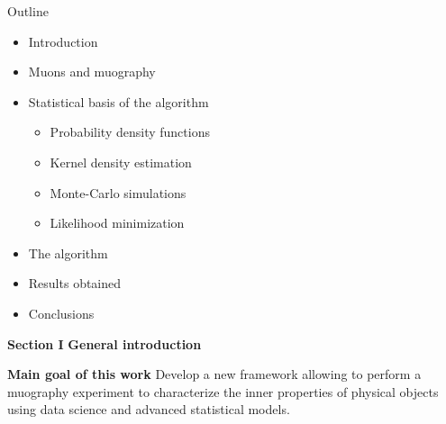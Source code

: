 \documentclass[8 pt]{beamer}
\begin{document}
\begin{frame}{Outline}

	\begin{itemize}
		\item Introduction \vfill
		\item Muons and muography \vfill
		\item Statistical basis of the algorithm
		\begin{itemize}
			\item Probability density functions
			\item Kernel density estimation
			\item Monte-Carlo simulations
			\item Likelihood minimization
		\end{itemize} \vfill
		\item The algorithm \vfill
		\item Results obtained \vfill
		\item Conclusions \vfill
	\end{itemize}

\end{frame}






\begin{frame}{}
	\centering
	\huge{\textbf{\color{mycolor} Section I}} \newline
	\LARGE{\textbf{\color{mycolor} General introduction \color{black}}} \vfill
	
	\LARGE{\textbf{\color{black} Main goal of this work \color{black}}}\newline \vspace{10pt} Develop a new framework allowing to perform a muography experiment to characterize the inner properties of physical objects using data science and advanced statistical models. \vfill
\end{frame}
\end{document}
